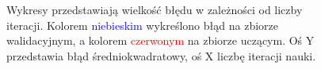 \documentclass[a4paper]{article}
\begin{document}
\begin{figure}[h]
  		\caption{Wykresy przedstawiają wielkość błędu w zależności od liczby iteracji.
  		Kolorem \textcolor{blue}{niebieskim} wykreślono błąd na zbiorze walidacyjnym,
  		a kolorem \textcolor{red}{czerwonym} na zbiorze uczącym.
  		Oś Y przedstawia błąd średniokwadratowy, oś X liczbę iteracji nauki.}
  		\label{fig:ttresults}
	\end{figure}
	\clearpage
	
\end{document}

